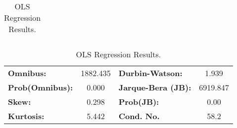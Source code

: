 \begin{landscape}
\begin{table}
\begin{center}
\begin{tabular}{lcccccc}
\bottomrule
\end{tabular}
\begin{tabular}{lclc}
\textbf{Omnibus:}       & 1882.435 & \textbf{  Durbin-Watson:     } &    1.939  \\
\textbf{Prob(Omnibus):} &   0.000  & \textbf{  Jarque-Bera (JB):  } & 6919.847  \\
\textbf{Skew:}          &   0.298  & \textbf{  Prob(JB):          } &     0.00  \\
\textbf{Kurtosis:}      &   5.442  & \textbf{  Cond. No.          } &     58.2  \\
\bottomrule
\end{tabular}
\caption{OLS Regression Results.}
\label{tab:OLS_table}
\end{center}
\end{table}
\end{landscape}


